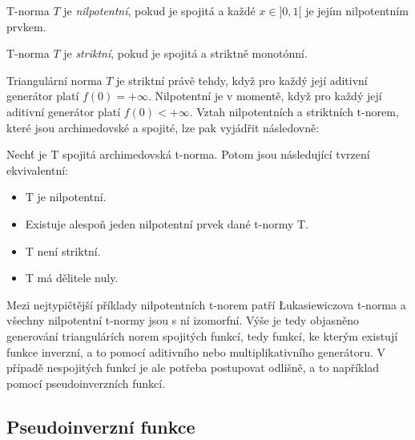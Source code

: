     \begin{definition}
    \cite{KMP}
        T-norma $T$ je {\em nilpotentní}, pokud je spojitá a každé $x
        \in ]0,1[$ je jejím nilpotentním prvkem.
    \end{definition}    
    \begin{definition}
    \cite{KMP}
        T-norma $T$ je {\em striktní}, pokud je
            spojitá a striktně monot\' onní.
    \end{definition} 
    Triangul\'arn\'i norma $T$ je striktní právě tehdy, když pro každý její aditivní generátor platí $f(0) = +\infty$. Nilpotentní je v momentě, když pro každý její aditivní generátor platí $f(0) < +\infty$. Vztah nilpotentních a striktních t-norem, které jsou archimedovské a spojité, lze pak vyjádřit následovně:
    \begin{sentence}\cite{KMP}
        Nech\' t je T spojitá archimedovská t-norma. Potom jsou následující tvrzení ekvivalentní:
        \begin{itemize}
        \item T je nilpotentní.
        \item  Existuje alespo\v n jeden nilpotentní prvek dané t-normy T.
        \item T není striktní.
        \item  T má dělitele nuly.
        \end{itemize}
    \end{sentence}
    Mezi nejtypičtější příklady nilpotentních t-norem patří Łukasiewiczova t-norma a všechny nilpotentní t-normy jsou s ní izomorfní.
    Výše je tedy objasněno generování triangulárích norem spojitých funkcí, tedy funkcí, ke kterým existují funkce inverzní, a to pomocí aditivního nebo multiplikativního generátoru. V případě nespojitých funkcí je ale potřeba postupovat odlišně, a to nap\v r\'iklad pomocí pseudoinverzních funkcí.


\subsection{Pseudoinverzn\'i funkce}

